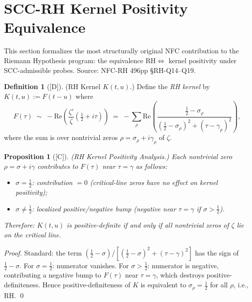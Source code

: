 \documentclass[12pt,oneside]{amsbook}
\theoremstyle{plain}
\newtheorem{proposition}[theorem]{Proposition}
\theoremstyle{definition}
\newtheorem{definition}[theorem]{Definition}
\theoremstyle{remark}
\newcommand{\status}[1]{\textup{[#1]}}
\begin{document}
\section{SCC-RH Kernel Positivity Equivalence}
\label{sec:scc-rh-kernel}

This section formalizes the most structurally original NFC
contribution to the Riemann Hypothesis program: the equivalence
$\mathrm{RH} \Longleftrightarrow$ kernel positivity under
SCC-admissible probes. Source: NFC-RH 496pp §RH-Q14--Q19.

\begin{definition}[\status{D}]\label{def:rh-kernel}
\textup{(RH Kernel $K(t,u)$.)}
Define the \emph{RH kernel} by $K(t,u) := F(t-u)$ where
\[
 F(\tau) \;\sim\; -\mathrm{Re}\!\left(\frac{\zeta'}{\zeta}
 \!\left(\tfrac{1}{2}+i\tau\right)\right)
 \;=\; -\sum_\rho \mathrm{Re}\!\left(
 \frac{\tfrac{1}{2}-\sigma_\rho}{(\tfrac{1}{2}-\sigma_\rho)^2
 + (\tau-\gamma_\rho)^2}\right),
\]
where the sum is over nontrivial zeros $\rho = \sigma_\rho +
i\gamma_\rho$ of $\zeta$.
\end{definition}

\begin{proposition}[\status{C}]\label{prop:rh-kernel-positivity}
\textup{(RH Kernel Positivity Analysis.)}
Each nontrivial zero $\rho = \sigma + i\gamma$ contributes to
$F(\tau)$ near $\tau = \gamma$ as follows:
\begin{itemize}
 \item $\sigma = \tfrac{1}{2}$: contribution $= 0$ (critical-line
 zeros have no effect on kernel positivity);
 \item $\sigma \neq \tfrac{1}{2}$: localized positive/negative bump
 (negative near $\tau = \gamma$ if $\sigma > \tfrac{1}{2}$).
\end{itemize}
Therefore: $K(t,u)$ is positive-definite if and only if all
nontrivial zeros of $\zeta$ lie on the critical line.
\end{proposition}

\begin{proof}
Standard: the term $(\tfrac{1}{2}-\sigma)/[(\tfrac{1}{2}-\sigma)^2
+ (\tau-\gamma)^2]$ has the sign of $\tfrac{1}{2}-\sigma$.
For $\sigma = \tfrac{1}{2}$: numerator vanishes.
For $\sigma > \tfrac{1}{2}$: numerator is negative, contributing
a negative bump to $F(\tau)$ near $\tau = \gamma$, which
destroys positive-definiteness.
Hence positive-definiteness of $K$ is equivalent to $\sigma_\rho
= \tfrac{1}{2}$ for all $\rho$, i.e., RH. \qed
\end{proof}
\end{document}
